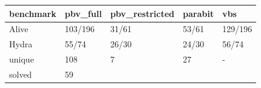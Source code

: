 \begin{tabular}{lllll}
\toprule
benchmark & pbv_full & pbv_restricted & parabit & vbs \\
\midrule
Alive & 103/196 & 31/61 & 53/61 & 129/196 \\
Hydra & 55/74 & 26/30 & 24/30 & 56/74 \\
unique & 108 & 7 & 27 & - \\
solved & 59%
\bottomrule
\end{tabular}
